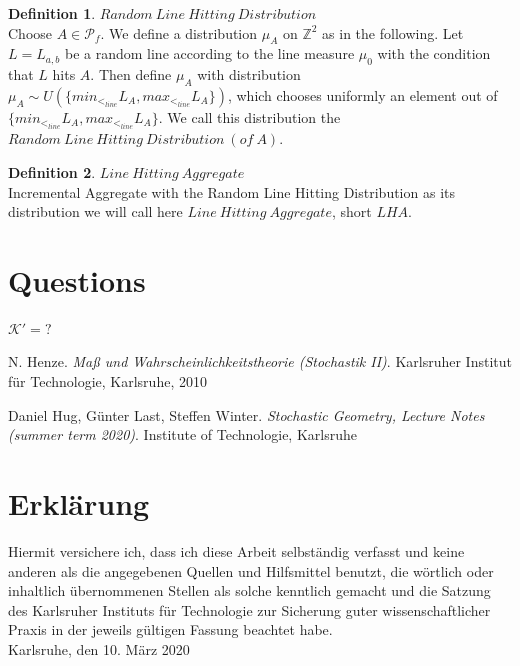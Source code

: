 \documentclass[12pt,a4paper]{scrartcl}
\numberwithin{equation}{section}
\numberwithin{equation}{section}
\theoremstyle{definition}
\newtheorem{definition}{Definition}
\begin{document}
\begin{definition} $\mathit{Random\ Line\ Hitting\ Distribution}$\\
	\indent Choose $A\in \mathcal{P}_f$. We define a distribution $\mu_A$ on $\mathbb{Z}^2$ as in the following. 
	Let $L=L_{a,b}$ be a random line according to the line measure $\mu_0$ with the condition that $L$ hits $A$. Then define $\mu_A$ with distribution $\mu_A \sim U(\{min_{<_{line}}L_A, max_{<_{line}}L_A\})$, which chooses uniformly an element out of $\{min_{<_{line}}L_A, max_{<_{line}}L_A\}$. We call this distribution the $\mathit{Random\ Line\ Hitting\ Distribution\ (of\ A)}$.
\end{definition}

\begin{definition} $\mathit{Line\ Hitting\ Aggregate}$\\
	\indent Incremental Aggregate with the Random Line Hitting Distribution as its distribution we will call here $\mathit{Line\ Hitting\ Aggregate}$, short $\mathit{LHA}$. 
\end{definition}

\section{Questions}
$\mathcal{K}'=?$

\newpage

\begin{thebibliography}{biblio}
\thispagestyle{empty}

N. Henze.
\emph{Maß und Wahrscheinlichkeitstheorie (Stochastik II)}.
Karlsruher Institut für Technologie, Karlsruhe, 2010

Daniel Hug, Günter Last, Steffen Winter.
\emph{Stochastic Geometry, 	Lecture Notes (summer term 2020)}.
Institute of Technologie, Karlsruhe



\end{thebibliography}

\newpage
  
\thispagestyle{empty}

\vspace*{8cm}


\section*{Erklärung}

Hiermit versichere ich, dass ich diese Arbeit selbständig verfasst und keine anderen als die angegebenen Quellen und Hilfsmittel benutzt, die wörtlich oder inhaltlich übernommenen Stellen als solche kenntlich gemacht und die Satzung des Karlsruher Instituts für Technologie zur Sicherung guter wissenschaftlicher Praxis in der jeweils gültigen Fassung beachtet habe. \\[2ex] 

\noindent
Karlsruhe, den 10. März 2020\\[5ex] 
\end{document}
